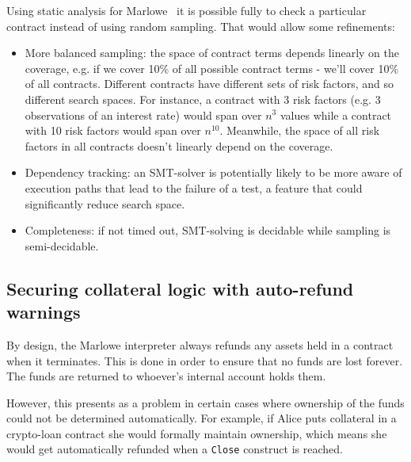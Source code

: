 \documentclass[runningheads]{llncs}
\begin{document}
Using static analysis for Marlowe~\cite{} it is possible fully to check a particular contract instead of using random
sampling. That would allow some refinements: 
\begin{itemize}
\item More balanced sampling: the space of contract terms depends linearly on
the coverage, e.g. if we cover 10\% of all possible contract terms
- we'll cover 10\% of all contracts. Different contracts have different
sets of risk factors, and so different search spaces. For instance, a
contract with 3 risk factors (e.g. 3 observations of an interest rate)
would span over $n^3$ values while a contract with 10 risk
factors would span over $n^{10}$. Meanwhile, the space of
all risk factors in all contracts doesn't linearly depend on the coverage.
\item Dependency tracking: an SMT-solver is potentially likely to be more aware of execution
paths that lead to the failure of a test, a feature that could significantly reduce
search space. 
\item Completeness: if not timed out, SMT-solving is decidable while sampling
is semi-decidable. 
\end{itemize}

\subsection{Securing collateral logic with auto-refund warnings}

By design, the Marlowe interpreter always refunds any assets held in a
contract when it terminates. This is done in order to ensure that
no funds are lost forever. The funds are returned to whoever's internal
account  holds them.

However, this presents as a problem in certain cases where ownership
of the funds could not be  determined automatically. For example, if
Alice puts collateral in a crypto-loan contract she would formally
maintain ownership, which means she would get automatically refunded
when a \texttt{Close} construct is reached.
\end{document}

